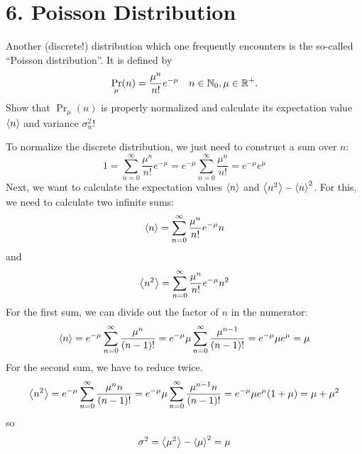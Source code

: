 \documentclass[a4paper,twoside]{article}
\begin{document}
\section*{6. Poisson Distribution}
Another (discrete!) distribution which one frequently encounters is the so-called ``Poisson distribution''. It is defined by
\begin{equation}
    \Pr_{\mu}(n) = \frac{\mu^n}{n!} e^{- \mu} \quad n \in \mathbb{N}_0, \mu \in \mathbb{R}^+.
\end{equation}
Show that $ \Pr_{\mu}(n) $ is properly normalized and calculate its expectation value $ \ev{n} $ and variance $ \sigma^2_n $!
\begin{problem}
    To normalize the discrete distribution, we just need to construct a sum over $ n $:
    \begin{equation}
        1 = \sum_{n=0}^{\infty} \frac{\mu^n}{n!} e^{- \mu} = e^{- \mu} \sum_{n=0}^{\infty} \frac{\mu^n}{n!} = e^{- \mu} e^{\mu}
    \end{equation}
    Next, we want to calculate the expectation values $ \ev{n} $ and $ \ev{n^2} - \ev{n}^2 $. For this, we need to calculate two infinite sums:
    \begin{equation}
        \ev{n} = \sum_{n=0}^{\infty} \frac{\mu^n}{n!} e^{- \mu} n
    \end{equation}
    and
    \begin{equation}
        \ev{n^2} = \sum_{n=0}^{\infty} \frac{\mu^n}{n!} e^{- \mu} n^2
    \end{equation}
    For the first sum, we can divide out the factor of $ n $ in the numerator:
    \begin{equation}
        \ev{n} = e^{- \mu} \sum_{n=0}^{\infty} \frac{\mu^n}{(n-1)!} = e^{- \mu}\mu \sum_{n=0}^{\infty} \frac{\mu^{n-1}}{(n-1)!} = e^{- \mu} \mu e^{\mu} = \mu
    \end{equation}
    For the second sum, we have to reduce twice.
    \begin{equation}
        \ev{n^2} = e^{- \mu} \sum_{n=0}^{\infty} \frac{\mu^n n}{(n-1)!} = e^{- \mu} \mu \sum_{n=0}^{\infty} \frac{\mu^{n-1} n}{(n-1)!} = e^{- \mu} \mu e^{\mu} (1 + \mu) = \mu + \mu^2
    \end{equation}
    so
    \begin{equation}
        \sigma^2 = \ev{\mu^2} - \ev{\mu}^2 = \mu
    \end{equation}

\end{problem}
\end{document}
